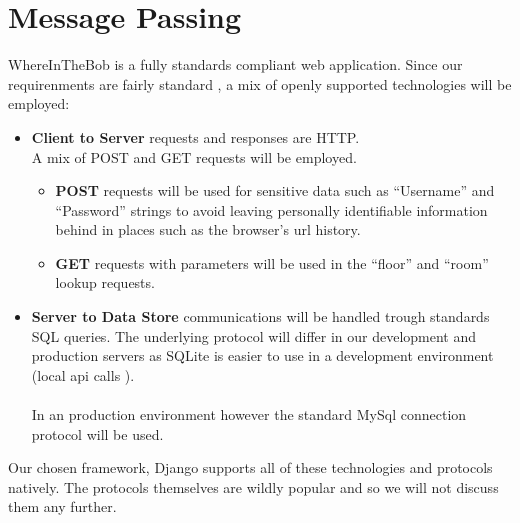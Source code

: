 \documentclass{sig-alt-release2}
\begin{document}
\section{Message Passing}


WhereInTheBob is a fully standards compliant web application.
Since our requirenments are fairly standard , a mix of openly supported 
technologies will be employed:

\begin{itemize}
\item \textbf{ Client to Server } requests and responses are HTTP.
\\ A mix of POST and GET requests will be employed. 
	\begin{itemize}
		\item \textbf{POST} requests will be used for sensitive data such as 
		``Username'' and ``Password'' strings
		to avoid leaving personally identifiable information behind in places
		such as the browser's url history.
		\item \textbf{GET} requests with parameters will be used in the
		``floor'' and ``room'' lookup requests. 
	\end{itemize}

\item \textbf{Server to Data Store } communications will be handled trough standards SQL queries.
The underlying protocol will differ in our development and production servers
as SQLite is easier to use in a development environment (local api calls ). \\
\\
In an production environment however the standard MySql connection protocol will
be used.
\end{itemize}
Our chosen framework, Django supports all of these technologies and protocols
natively. The protocols themselves are wildly popular and so we will not discuss
them any further.
\end{document}
